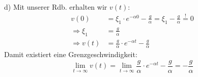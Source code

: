 \documentclass[11pt a4paper]{article}
\begin{document}
\newpage

d) Mit unserer Rdb. erhalten wir $v(t)$:
\begin{align*}
	v(0) 
	&= \xi_1 \cdot e^{-\alpha 0} -\frac g\alpha 
	= \xi_1 - \frac g\alpha \overset != 0 \\
	\Rightarrow
	\xi_1 
	&= \frac g\alpha \\
	\Rightarrow
	v(t) 
	&= \frac g\alpha \cdot e^{-\alpha t} -\frac g\alpha
\end{align*}
Damit existiert eine Grenzgeschwindigkeit:
\[
	\lim_{t \rightarrow \infty} v(t)
	=
	\lim_{t \rightarrow \infty}
	\frac g\alpha \cdot e^{-\alpha t} -\frac g\alpha
	=
	-\frac g\alpha
\]
\end{document}
